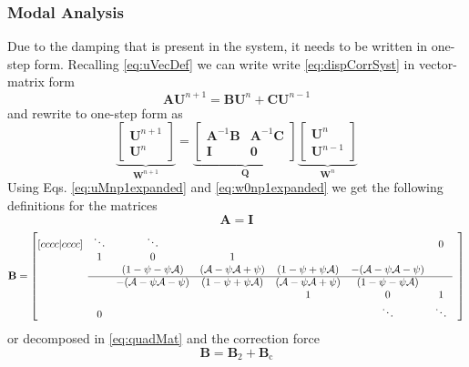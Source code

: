 \documentclass[dvipsnames]{article}
\def\I{\mathbf{I}}
\def\A{\mathbf{A}}
\def\B{\mathbf{B}}
\def\C{\mathbf{C}}
\def\Q{\mathbf{Q}}
\def\U{\mathbf{U}}
\def\Iterm{\mathcal{A}}
\begin{document}
\subsubsection{Modal Analysis}
Due to the damping that is present in the system, it needs to be written in one-step form. Recalling \eqref{eq:uVecDef} we can write write \eqref{eq:dispCorrSyst} in vector-matrix form
\begin{equation}\label{eq:formForOneStep}
    \A \U^{n+1} = \B \U^n + \C\U^{n-1}
\end{equation}
and rewrite to one-step form as
\begin{equation}\label{eq:oneStepForm}
    \underbrace{\begin{bmatrix}
        \U^{n+1}\\
        \U^n
    \end{bmatrix}}_{\mathbf{W}^{n+1}} = 
    \underbrace{\begin{bmatrix}
        \A^{-1}\B & \A^{-1}\C\\
        \I & \mathbf{0}
    \end{bmatrix}}_{\Q}
    \underbrace{\begin{bmatrix}
        \U^n\\
        \U^{n-1}
    \end{bmatrix}}_{\mathbf{W}^n}
\end{equation}
Using Eqs. \eqref{eq:uMnp1expanded} and \eqref{eq:w0np1expanded} we get the following definitions for the matrices
\begin{equation}
    \A = \I
\end{equation}
\begin{equation}
    \mathbf{B} = \begin{bmatrix}[cccc|cccc]
     & \ddots  &\ddots & & & & 0 & \\
       & 1 & 0 & 1 & & & & \\
      & & (1-\psi-\psi \Iterm) & (\Iterm-\psi\Iterm+\psi) & (1-\psi+\psi\Iterm) & -(\Iterm-\psi\Iterm - \psi) & \\ \cline{2-7}
      & & -(\Iterm-\psi\Iterm-\psi) & (1-\psi+\psi\Iterm) & (\Iterm-\psi\Iterm+\psi) & (1-\psi-\psi\Iterm) & & \\
         & & & &1 & 0 & 1  \\
         & 0 & &  &  &\ddots & \ddots &
    \end{bmatrix}
\end{equation}
or decomposed in \eqref{eq:quadMat} and the correction force
\begin{equation}
    \mathbf{B} = \mathbf{B}_2 + \mathbf{B}_\text{c}
\end{equation}
\end{document}
